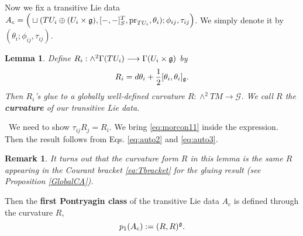 \documentclass[letterpaper,10pt, oneside]{article} %
\newtheorem{lem}[thm]{Lemma}\newtheorem{lemma}[thm]{Lemma}
\newtheorem{rmk}[thm]{Remark}
\newcommand{\calc}[1]{} %
\newcommand{\pf}{\noindent{\bf Proof.}\ }
\newcommand{\huaG}{\mathcal{G}}
\def\qed{\hfill ~\vrule height6pt width6pt depth0pt}
\newcommand{\half}{\frac{1}{2}}
\newcommand{\pr}{\mathrm{pr}}
\begin{document}
Now we fix a transitive Lie data $A_c=\Big(\sqcup (TU_i\oplus(U_i\times\g),
[-,-]^T_S,\pr_{TU_i},\theta_i);\phi_{ij},\tau_{ij}\Big)$. We simply denote it by $(\theta_i;\phi_{ij},\tau_{ij})$.
\begin{lem}\label{lem:gglueR}
Define  $R_i:\wedge^2\Gamma(TU_i)\longrightarrow \Gamma(U_i\times \mathfrak g)$ by
\begin{equation}
  R_i=d\theta_i+\half[\theta_i,\theta_i]_\g.
\end{equation}  Then $R_i$'s glue to a globally well-defined curvature $R:\wedge^2TM\longrightarrow\huaG$.   We call $R$ the {\bf curvature} of our transitive Lie data.
\end{lem}
\pf We need to show $\tau_{ij}R_j=R_i$. We bring \eqref{eq:morcon11} inside the expression. Then the result follows from Eqs. \eqref{eq:auto2} and \eqref{eq:auto3}.\qed
\calc{
By \eqref{eq:auto2}, \eqref{eq:auto3} and \eqref{eq:morcon11}, we have
\begin{eqnarray*}
  R_i(X,Y)-\tau_{ij}R_j(X,Y)&=&[\theta_i(X),\theta_i(Y)]_\g+d\theta_i(X,Y)-\tau_{ij}\big([\theta_j(X),\theta_j(Y)]_\g+d\theta_j(X,Y)\big)\\
  &=&[\tau_{ij}\theta_j(X)+\phi_{ij}(X),\tau_{ij}\theta_j(Y)+\phi_{ij}(Y)]_\g\\
  &&+X\big(\tau_{ij}\theta_j(Y)+\phi_{ij}(Y)\big)-Y\big(\tau_{ij}\theta_j(X)+\phi_{ij}(X)\big)\\
  &&-\tau_{ij}\theta_j([X,Y])-\phi_{ij}([X,Y])-\tau_{ij}[\theta_j(X),\theta_j(Y)]_\g\\
    &&-\tau_{ij}X(\theta_j(Y))+\tau_{ij}Y(\theta_j(X))+\tau_{ij}(\theta_j([X,Y]))\\
    &=&X(\phi_{ij}(Y))-Y(\phi_{ij}(X))-\phi_{ij}([X,Y])+[ \phi_{ij}(X), \phi_{ij}(Y)]_\g\\
    &&+X (\tau_{ij}\theta_j(Y))-\tau_{ij}X(\theta_j(Y))+[\phi_{ij}(X),\tau_{ij}\theta_j(Y)]_\g\\
    &&-Y (\tau_{ij}\theta_j(X))+\tau_{ij}Y(\theta_j(X))-[\phi_{ij}(Y),\tau_{ij}\theta_j(X)]_\g\\
    &=&0.
\end{eqnarray*}}
\begin{rmk}
 It turns out that the curvature form $R$ in this lemma is the same $R$ appearing in the Courant bracket \eqref{eq:Tbracket} for the gluing result (see Proposition \ref{GlobalCA}).
\end{rmk}


Then the {\bf first Pontryagin class} of the transitive Lie data $A_c$ is defined through the curvature $R$,
\begin{equation}
  p_1(A_c):=(R,R)^\mathfrak g.
\end{equation}
\end{document}
